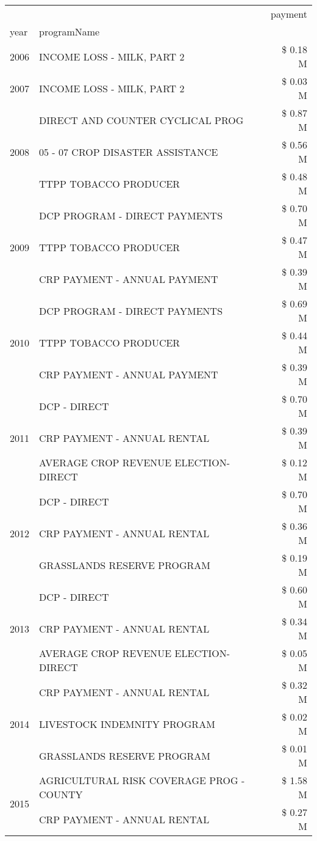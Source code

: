 \begin{tabular}{llr}
\toprule
 &  & payment \\
year & programName &  \\
\midrule
2006 & INCOME LOSS - MILK, PART 2 & \$ 0.18 M \\
\cline{1-3}
2007 & INCOME LOSS - MILK, PART 2 & \$ 0.03 M \\
\cline{1-3}
\multirow[t]{3}{*}{2008} & DIRECT AND COUNTER CYCLICAL PROG & \$ 0.87 M \\
 & 05 - 07 CROP DISASTER ASSISTANCE & \$ 0.56 M \\
 & TTPP TOBACCO PRODUCER & \$ 0.48 M \\
\cline{1-3}
\multirow[t]{3}{*}{2009} & DCP PROGRAM - DIRECT PAYMENTS & \$ 0.70 M \\
 & TTPP TOBACCO PRODUCER & \$ 0.47 M \\
 & CRP PAYMENT - ANNUAL PAYMENT & \$ 0.39 M \\
\cline{1-3}
\multirow[t]{3}{*}{2010} & DCP PROGRAM - DIRECT PAYMENTS & \$ 0.69 M \\
 & TTPP TOBACCO PRODUCER & \$ 0.44 M \\
 & CRP PAYMENT - ANNUAL PAYMENT & \$ 0.39 M \\
\cline{1-3}
\multirow[t]{3}{*}{2011} & DCP - DIRECT & \$ 0.70 M \\
 & CRP PAYMENT - ANNUAL RENTAL & \$ 0.39 M \\
 & AVERAGE CROP REVENUE ELECTION-DIRECT & \$ 0.12 M \\
\cline{1-3}
\multirow[t]{3}{*}{2012} & DCP - DIRECT & \$ 0.70 M \\
 & CRP PAYMENT - ANNUAL RENTAL & \$ 0.36 M \\
 & GRASSLANDS RESERVE PROGRAM & \$ 0.19 M \\
\cline{1-3}
\multirow[t]{3}{*}{2013} & DCP - DIRECT & \$ 0.60 M \\
 & CRP PAYMENT - ANNUAL RENTAL & \$ 0.34 M \\
 & AVERAGE CROP REVENUE ELECTION-DIRECT & \$ 0.05 M \\
\cline{1-3}
\multirow[t]{3}{*}{2014} & CRP PAYMENT - ANNUAL RENTAL & \$ 0.32 M \\
 & LIVESTOCK INDEMNITY PROGRAM & \$ 0.02 M \\
 & GRASSLANDS RESERVE PROGRAM & \$ 0.01 M \\
\cline{1-3}
\multirow[t]{3}{*}{2015} & AGRICULTURAL RISK COVERAGE PROG - COUNTY & \$ 1.58 M \\
 & CRP PAYMENT - ANNUAL RENTAL & \$ 0.27 M \\

\end{tabular}

